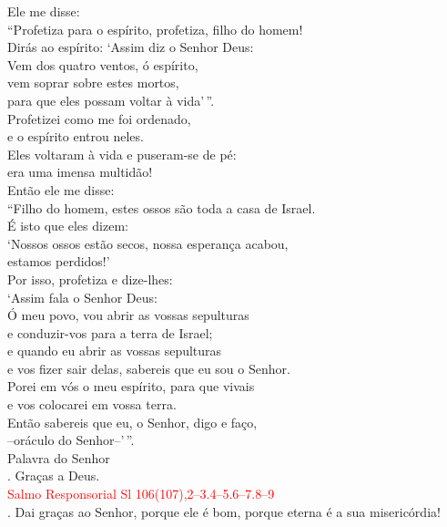 \documentclass{book}
\begin{document}
\begin{flushleft}
    Ele me disse: \\
    ``Profetiza para o espírito, profetiza, filho do homem! \\
    Dirás ao espírito: `Assim diz o Senhor Deus: \\
    Vem dos quatro ventos, ó espírito, \\
    vem soprar sobre estes mortos, \\
    para que eles possam voltar à vida'\,''. \\
    Profetizei como me foi ordenado, \\
    e o espírito entrou neles. \\
    Eles voltaram à vida e puseram-se de pé: \\
    era uma imensa multidão! \\
    Então ele me disse: \\
    ``Filho do homem, estes ossos são toda a casa de Israel. \\
    É isto que eles dizem: \\
    `Nossos ossos estão secos, nossa esperança acabou, \\
    estamos perdidos!' \\
    Por isso, profetiza e dize-lhes: \\
    `Assim fala o Senhor Deus: \\
    Ó meu povo, vou abrir as vossas sepulturas \\
    e conduzir-vos para a terra de Israel; \\
    e quando eu abrir as vossas sepulturas \\
    e vos fizer sair delas, sabereis que eu sou o Senhor. \\
    Porei em vós o meu espírito, para que vivais \\
    e vos colocarei em vossa terra. \\
    Então sabereis que eu, o Senhor, digo e faço, \\
    --oráculo do Senhor--'\,''.
    \vspace{0.1cm} \\
    Palavra do Senhor \\
    {\color{red} \Rbar.} Graças a Deus.
    \vspace{0.2cm} \\
    \textcolor{red}{Salmo Responsorial
        \hspace{\fill} Sl 106(107),2--3.4--5.6--7.8--9}
    \vspace{0.1cm} \\
    {\color{red} \Rbar.} Dai graças ao Senhor, porque ele é bom, porque eterna é a sua misericórdia!

\end{flushleft}
\end{document}
